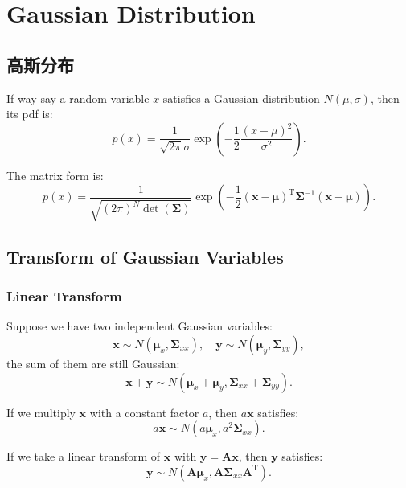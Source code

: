 \chapter{Gaussian Distribution}
\section{高斯分布}
If way say a random variable $x$ satisfies a Gaussian distribution $N(\mu, \sigma)$, then its pdf is:
\begin{equation}
p\left( x \right) = \frac{1}{{\sqrt {2\pi } \sigma }}\exp \left( { - \frac{1}{2}\frac{{{{\left( {x - \mu } \right)}^2}}}{{{\sigma ^2}}}} \right).
\end{equation}

The matrix form is:
\begin{equation}
p\left( x \right) = \frac{1}{{\sqrt {(2\pi)^N  \det \left( \boldsymbol{\Sigma } \right) }}}\exp \left( { - \frac{1}{2}{{\left( {\mathbf{x} - \boldsymbol{\mu} } \right)}^\mathrm{T}}{\boldsymbol{\Sigma} ^{ - 1}}\left( {\mathbf{x} - \boldsymbol{\mu} } \right)} \right).
\end{equation}

\section{Transform of Gaussian Variables}
\subsection{Linear Transform}
Suppose we have two independent Gaussian variables:
\[
\mathbf{x} \sim N( \boldsymbol{\mu}_x, \boldsymbol{\Sigma}_{xx} ), \quad \mathbf{y} \sim N( \boldsymbol{\mu}_y, \boldsymbol{\Sigma}_{yy} ),
\]
the sum of them are still Gaussian: 
\begin{equation}
\mathbf{x}+\mathbf{y} \sim N( \boldsymbol{\mu}_x + \boldsymbol{\mu}_y, \boldsymbol{\Sigma}_{xx} + \boldsymbol{\Sigma}_{yy}).
\end{equation}

If we multiply $\mathbf{x}$ with a constant factor $a$, then $a \mathbf{x}$ satisfies:
\begin{equation}
a\mathbf{x} \sim N( a \boldsymbol{\mu}_x, a^2 \boldsymbol{\Sigma}_{xx}).
\end{equation}

If we take a linear transform of $\mathbf{x}$ with $\mathbf{y} = \mathbf{A} \mathbf{x}$, then $\mathbf{y}$ satisfies:
\begin{equation}
\mathbf{y} \sim N( \mathbf{A} \boldsymbol{\mu}_x, \mathbf{A} \boldsymbol{\Sigma}_{xx} \mathbf{A}^\mathrm{T}).
\end{equation}

